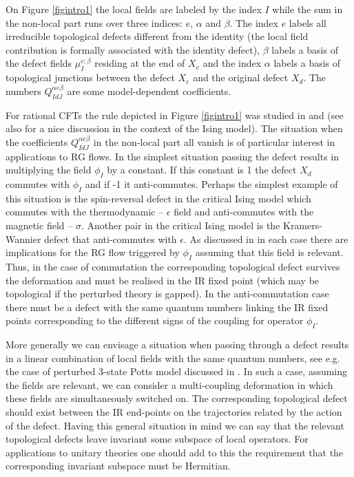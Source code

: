 \documentclass[a4paper,11pt]{article}
\theoremstyle{plain}
\theoremstyle{definition}
\begin{document}
On Figure   \ref{figintro1} the local fields are labeled by the index $I$ while
the sum  in the non-local part runs  over three indices: $e$, $\alpha$ and $\beta$. The index $e$ labels all irreducible topological defects different 
from the identity   (the local field contribution is formally associated with the 
identity defect), $\beta$ labels a basis of the defect fields $ \mu_{I}^{e;\beta}$ residing at the end of $X_{e}$ and the index $\alpha$ 
 labels a basis of topological junctions 
between the defect $X_{e}$ and the original defect $X_{d}$. 
The numbers $Q^{\alpha e\beta}_{IdJ}$ are some model-dependent coefficients.   




For rational CFTs  the rule depicted in Figure \ref{figintro1} was studied in \cite{FFRS} and \cite{Runkelcharges} (see  also \cite{KW} for a nice discussion in the context of the Ising model).
The situation when the coefficients $Q^{\alpha e\beta}_{IdJ}$  in the non-local part all vanish  is of particular interest in applications to RG flows. 
In the simplest situation passing the defect results in multiplying the field $\phi_{I}$ by a constant. 
 If this constant is 1 the 
defect $X_d$ commutes with $\phi_I$ and if -1 it anti-commutes. 
Perhaps the simplest example of this situation is the spin-reversal defect in the critical Ising model which commutes with the thermodynamic -- $\epsilon$  
field and anti-commutes with the magnetic field -- $\sigma$. Another pair in the critical Ising model is the Kramers-Wannier defect that anti-commutes with $\epsilon$.
As discussed in \cite{5A} in each case there are implications for the RG flow triggered by 
$\phi_I$ assuming that this field is relevant. Thus, in the case of commutation the corresponding topological defect survives the deformation and must be realised in the IR fixed point (which may be topological if the perturbed theory is gapped). In the anti-commutation case there must be a defect with the same quantum numbers linking the IR fixed points corresponding to the different signs of the coupling for operator $\phi_I$. 

More generally we can envisage a situation when passing through a defect results in a linear combination of local fields with the same quantum numbers, see e.g. the case of perturbed 3-state Potts model discussed in \cite{5A}. In such a case, assuming the fields are relevant, we can consider 
a multi-coupling  deformation  in which these fields  are simultaneously switched on. The corresponding topological defect  should exist between the IR end-points on the trajectories related by the action of the defect. Having this general situation in mind we can say that  the relevant topological defects leave invariant some subspace of local operators. For applications to unitary theories one should add to this the requirement that the corresponding invariant subspace must be Hermitian. 
\end{document}
